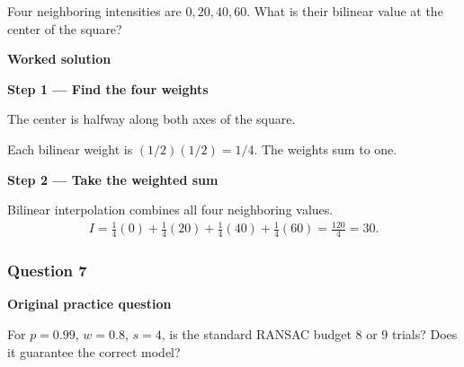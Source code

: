 \documentclass[letterpaper,11pt,english,openany,oneside]{jupyterBook}
\begin{document}
\sphinxAtStartPar
Four neighboring intensities are \(0,20,40,60\). What is their bilinear value at the center of the square?

\par\medskip

\par\medskip
\textbf{Worked solution}\par\smallskip

\par\medskip{}
{\color{QuizStepRed}\bfseries Step 1 — Find the four weights}\par\smallskip

\sphinxAtStartPar
{} The center is halfway along both axes of the square.

\sphinxAtStartPar
Each bilinear weight is {\color{QuizMathBlue} \((1/2)(1/2)=1/4\)}. The weights sum to one.

\par

\par\medskip{}
{\color{QuizStepRed}\bfseries Step 2 — Take the weighted sum}\par\smallskip

\sphinxAtStartPar
{} Bilinear interpolation combines all four neighboring values.
{\color{QuizMathBlue} \begin{equation*}
\begin{split}
I=\frac14(0)+\frac14(20)+\frac14(40)+\frac14(60)=\frac{120}{4}=30.
\end{split}
\end{equation*}}
\par

\par\medskip


\subsubsection{Question 7}
\label{\detokenize{lectures/lecture02/tldr:question-7}}\label{\detokenize{lectures/lecture02/tldr:lec02-tldr-q7}}
\par\medskip\textbf{Original practice question}\par\smallskip

\sphinxAtStartPar
For \(p=0.99\), \(w=0.8\), \(s=4\), is the standard RANSAC budget 8 or 9 trials? Does it guarantee the correct model?

\par\medskip
\end{document}
